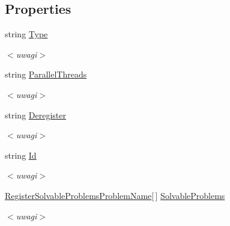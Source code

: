 \subsection*{Properties}
\begin{DoxyCompactItemize}
\item 
\hypertarget{class_register_a2a79058af7004aa0265253d62b9110f9}{}string \hyperlink{class_register_a2a79058af7004aa0265253d62b9110f9}{Type}\label{class_register_a2a79058af7004aa0265253d62b9110f9}

\begin{DoxyCompactList}\small\item\em $<$uwagi$>$ \end{DoxyCompactList}\item 
\hypertarget{class_register_a7e055336595d4abe1ab819ad3d2e48fa}{}string \hyperlink{class_register_a7e055336595d4abe1ab819ad3d2e48fa}{Parallel\+Threads}\label{class_register_a7e055336595d4abe1ab819ad3d2e48fa}

\begin{DoxyCompactList}\small\item\em $<$uwagi$>$ \end{DoxyCompactList}\item 
\hypertarget{class_register_aab81b110159cd4e74dbd25f4bf81167c}{}string \hyperlink{class_register_aab81b110159cd4e74dbd25f4bf81167c}{Deregister}\label{class_register_aab81b110159cd4e74dbd25f4bf81167c}

\begin{DoxyCompactList}\small\item\em $<$uwagi$>$ \end{DoxyCompactList}\item 
\hypertarget{class_register_ae0bd98b9a644f6067f33a158cabebb17}{}string \hyperlink{class_register_ae0bd98b9a644f6067f33a158cabebb17}{Id}\label{class_register_ae0bd98b9a644f6067f33a158cabebb17}

\begin{DoxyCompactList}\small\item\em $<$uwagi$>$ \end{DoxyCompactList}\item 
\hypertarget{class_register_a1edb9916b037555931ed163af0beea94}{}\hyperlink{class_register_solvable_problems_problem_name}{Register\+Solvable\+Problems\+Problem\+Name}\mbox{[}$\,$\mbox{]} \hyperlink{class_register_a1edb9916b037555931ed163af0beea94}{Solvable\+Problems}\label{class_register_a1edb9916b037555931ed163af0beea94}

\begin{DoxyCompactList}\small\item\em $<$uwagi$>$ \end{DoxyCompactList}\end{DoxyCompactItemize}


